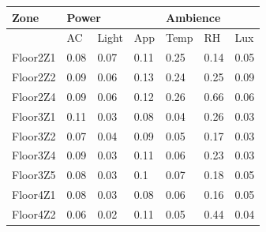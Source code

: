 \begin{table}[]
\begin{tabular}{|l|l|l|l|l|l|l|}
\hline
Zone & \multicolumn{3}{l|}{Power} & \multicolumn{3}{l|}{Ambience} \\ \hline
 &   AC  & Light   & App     & Temp     & RH    & Lux             \\ \hline
Floor2Z1 & 0.08                     & 0.07                             & 0.11                          & 0.25                         & 0.14                          & 0.05                            \\ \hline
Floor2Z2 & 0.09                     & 0.06                             & 0.13                          & 0.24                         & 0.25                          & 0.09                            \\ \hline
Floor2Z4 & 0.09                     & 0.06                             & 0.12                          & 0.26                         & 0.66                          & 0.06                         \\ \hline
Floor3Z1 & 0.11                     & 0.03                             & 0.08                          & 0.04                         & 0.26                          & 0.03                            \\ \hline
Floor3Z2 & 0.07                     & 0.04                             & 0.09                          & 0.05                         & 0.17                          & 0.03                            \\ \hline
Floor3Z4 & 0.09                     & 0.03                             & 0.11                          & 0.06                         & 0.23                          & 0.03                            \\ \hline
Floor3Z5 & 0.08                     & 0.03                             & 0.1                           & 0.07                         & 0.18                          & 0.05                            \\ \hline
Floor4Z1 & 0.08                     & 0.03                             & 0.08                          & 0.06                         & 0.16                          & 0.05                            \\ \hline
Floor4Z2 & 0.06                     & 0.02                             & 0.11                          & 0.05                         & 0.44                          & 0.04                            \\ \hline

\end{tabular}
\end{table}
